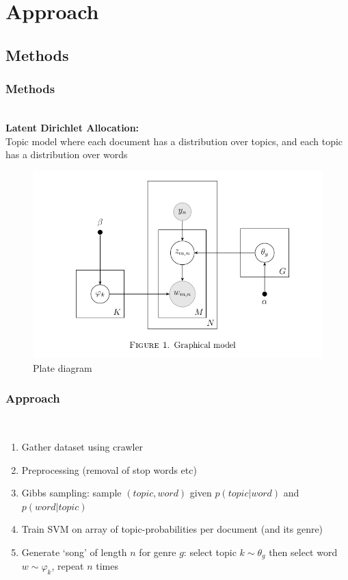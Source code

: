 \documentclass[t,ignorenonframetext]{beamer}
\begin{document}
\section[Approach]{Approach}
\subsection{Methods}
\frametitle{Methods}
\begin{frame}
~\\\textbf{Latent Dirichlet Allocation:} \\Topic model where each document has a distribution over topics, and each topic has a distribution over words
\begin{center}
\begin{figure}
\includegraphics[scale=0.25]{plate}
\caption{Plate diagram}
\end{figure}
\end{center}

\end{frame}

\begin{frame}
\frametitle{Approach}~\\
\begin{enumerate}
	\item Gather dataset using crawler
	\item Preprocessing (removal of stop words etc)
	\item Gibbs sampling: sample $(topic,word)$ given $p(topic|word)$ and $p(word|topic)$
	\item Train SVM on array of topic-probabilities per document (and its genre)
	\item Generate `song' of length $n$ for genre $g$: select topic $k \sim \theta_g$ then select word $w \sim \varphi_k$, repeat $n$ times
\end{enumerate}

\end{frame}
\end{document}

